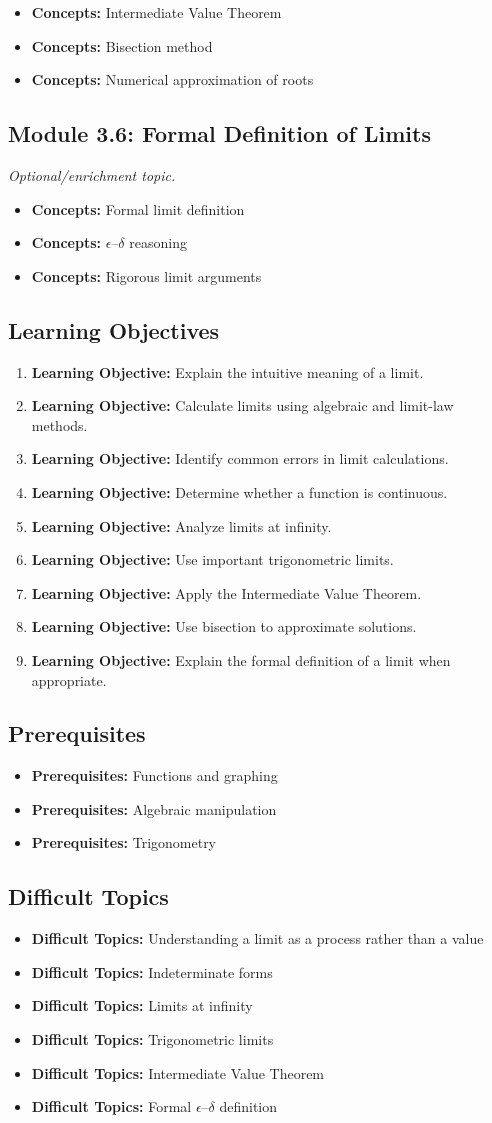 \documentclass[11pt]{article}
\newcommand{\objective}[1]{\item \textbf{Learning Objective:} #1}
\newcommand{\concept}[1]{\item \textbf{Concepts:} #1}
\newcommand{\difficult}[1]{\item \textbf{Difficult Topics:} #1}
\newcommand{\prereq}[1]{\item \textbf{Prerequisites:} #1}
\begin{document}
\begin{itemize}
    \concept{Intermediate Value Theorem}
    \concept{Bisection method}
    \concept{Numerical approximation of roots}
\end{itemize}

\subsection{Module 3.6: Formal Definition of Limits}

\textit{Optional/enrichment topic.}

\begin{itemize}
    \concept{Formal limit definition}
    \concept{$\epsilon$--$\delta$ reasoning}
    \concept{Rigorous limit arguments}
\end{itemize}

\subsection{Learning Objectives}

\begin{enumerate}
    \objective{Explain the intuitive meaning of a limit.}
    \objective{Calculate limits using algebraic and limit-law methods.}
    \objective{Identify common errors in limit calculations.}
    \objective{Determine whether a function is continuous.}
    \objective{Analyze limits at infinity.}
    \objective{Use important trigonometric limits.}
    \objective{Apply the Intermediate Value Theorem.}
    \objective{Use bisection to approximate solutions.}
    \objective{Explain the formal definition of a limit when appropriate.}
\end{enumerate}

\subsection{Prerequisites}

\begin{itemize}
    \prereq{Functions and graphing}
    \prereq{Algebraic manipulation}
    \prereq{Trigonometry}
\end{itemize}

\subsection{Difficult Topics}

\begin{itemize}
    \difficult{Understanding a limit as a process rather than a value}
    \difficult{Indeterminate forms}
    \difficult{Limits at infinity}
    \difficult{Trigonometric limits}
    \difficult{Intermediate Value Theorem}
    \difficult{Formal $\epsilon$--$\delta$ definition}
\end{itemize}
\end{document}
